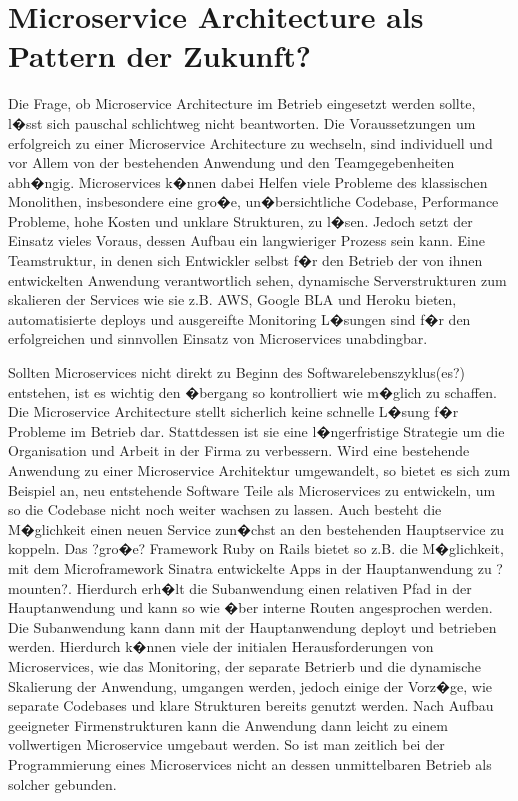 \chapter{Microservice Architecture als Pattern der Zukunft?}

Die Frage, ob Microservice Architecture im Betrieb eingesetzt werden sollte, l�sst sich pauschal schlichtweg nicht beantworten. Die Voraussetzungen um erfolgreich zu einer Microservice Architecture zu wechseln, sind individuell und vor Allem von der bestehenden Anwendung und den Teamgegebenheiten abh�ngig. Microservices k�nnen dabei Helfen viele Probleme des klassischen Monolithen, insbesondere eine gro�e, un�bersichtliche Codebase, Performance Probleme, hohe Kosten und unklare Strukturen, zu l�sen. Jedoch setzt der Einsatz vieles Voraus, dessen Aufbau ein langwieriger Prozess sein kann. Eine Teamstruktur, in denen sich Entwickler selbst f�r den Betrieb der von ihnen entwickelten Anwendung verantwortlich sehen, dynamische Serverstrukturen  zum skalieren der Services wie sie z.B. AWS, Google BLA und Heroku bieten, automatisierte deploys und ausgereifte Monitoring L�sungen sind f�r den erfolgreichen und sinnvollen Einsatz von Microservices unabdingbar.

Sollten Microservices nicht direkt zu Beginn des Softwarelebenszyklus(es?) entstehen, ist es wichtig den �bergang so kontrolliert wie m�glich zu schaffen. Die Microservice Architecture stellt sicherlich keine schnelle L�sung f�r Probleme im Betrieb dar. Stattdessen ist sie eine l�ngerfristige Strategie um die Organisation und Arbeit in der Firma zu verbessern. Wird eine bestehende Anwendung zu einer Microservice Architektur umgewandelt, so bietet es sich zum Beispiel an, neu entstehende Software Teile als Microservices zu entwickeln, um so die Codebase nicht noch weiter wachsen zu lassen. Auch besteht die M�glichkeit einen neuen Service zun�chst an den bestehenden Hauptservice zu koppeln. Das ?gro�e? Framework Ruby on Rails bietet so z.B. die M�glichkeit, mit dem Microframework Sinatra entwickelte Apps in der Hauptanwendung zu ?mounten?. Hierdurch erh�lt die Subanwendung einen relativen Pfad in der Hauptanwendung und kann so wie �ber interne Routen angesprochen werden. Die Subanwendung kann dann mit der Hauptanwendung deployt und betrieben werden. Hierdurch k�nnen viele der initialen Herausforderungen von Microservices, wie das Monitoring, der separate Betrierb und die dynamische Skalierung der Anwendung, umgangen werden, jedoch einige der Vorz�ge, wie separate Codebases und klare Strukturen bereits genutzt werden. Nach Aufbau geeigneter Firmenstrukturen kann die Anwendung dann leicht zu einem vollwertigen Microservice umgebaut werden. So ist man zeitlich bei der Programmierung eines Microservices nicht an dessen unmittelbaren Betrieb als solcher gebunden.

